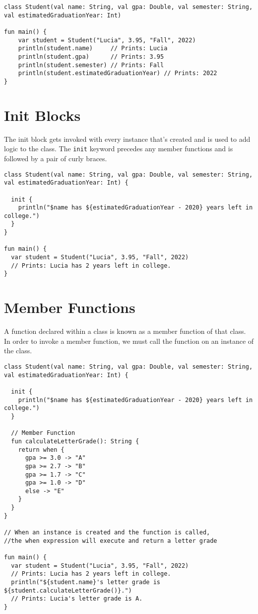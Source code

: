 \begin{verbatim}
class Student(val name: String, val gpa: Double, val semester: String, 
val estimatedGraduationYear: Int) 
 
fun main() {
    var student = Student("Lucia", 3.95, "Fall", 2022) 
    println(student.name)     // Prints: Lucia
    println(student.gpa)      // Prints: 3.95
    println(student.semester) // Prints: Fall
    println(student.estimatedGraduationYear) // Prints: 2022
}
\end{verbatim}

\section{Init Blocks}
The init block gets invoked with every instance that’s created and is used to add logic to the class. 
The \verb!init! keyword precedes any member functions and is followed by a pair of curly braces.

\begin{verbatim}
class Student(val name: String, val gpa: Double, val semester: String, 
val estimatedGraduationYear: Int) {
 
  init {
    println("$name has ${estimatedGraduationYear - 2020} years left in college.")
  }
}
 
fun main() {
  var student = Student("Lucia", 3.95, "Fall", 2022) 
  // Prints: Lucia has 2 years left in college. 
}
\end{verbatim}
\newpage
\section{Member Functions}
A function declared within a class is known as a member function of that class. 
In order to invoke a member function, we must call the function on an instance of the class.

\begin{verbatim}
class Student(val name: String, val gpa: Double, val semester: String,
val estimatedGraduationYear: Int) {
 
  init {
    println("$name has ${estimatedGraduationYear - 2020} years left in college.")
  }
 
  // Member Function
  fun calculateLetterGrade(): String {
    return when {
      gpa >= 3.0 -> "A"
      gpa >= 2.7 -> "B"
      gpa >= 1.7 -> "C"
      gpa >= 1.0 -> "D"
      else -> "E"
    }
  }
}
 
// When an instance is created and the function is called, 
//the when expression will execute and return a letter grade
 
fun main() {
  var student = Student("Lucia", 3.95, "Fall", 2022) 
  // Prints: Lucia has 2 years left in college. 
  println("${student.name}'s letter grade is ${student.calculateLetterGrade()}.") 
  // Prints: Lucia's letter grade is A. 
}
\end{verbatim}